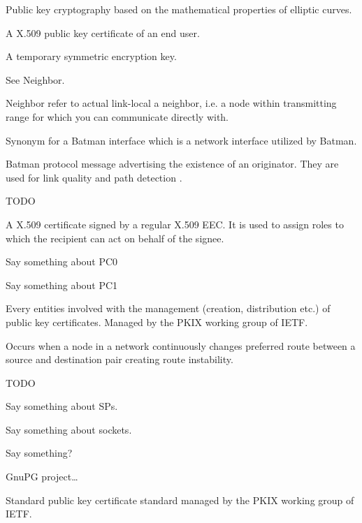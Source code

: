 \begin{acronym}
	Public key cryptography based on the mathematical properties of elliptic
	curves.

	A X.509 public key certificate of an end user.
	
	A temporary symmetric encryption key. 

	See Neighbor.


	Neighbor refer to actual link-local a neighbor, i.e. a node within
	transmitting range for which you can communicate directly with.

	Synonym for a Batman interface which is a network interface utilized by
	Batman.

	Batman protocol message advertising the existence of an originator. They are
	used for link quality and path detection \cite{batman_rfc}. %


	TODO

	A X.509 certificate signed by a regular X.509 EEC. It is used to assign roles
	to which the recipient can act on behalf of the signee.

	Say something about PC0
	
	Say something about PC1
	
	
	Every entities involved with the management (creation, distribution etc.) of
	public key certificates. Managed by the PKIX working group of IETF.


	Occurs when a node in a network continuously changes preferred route between a
	source and destination pair creating route instability.


	TODO

	Say something about SPs.


	Say something about sockets.

	Say something?

	GnuPG project\ldots

	Standard public key certificate standard managed by the PKIX working group of
	IETF.

\end{acronym}
